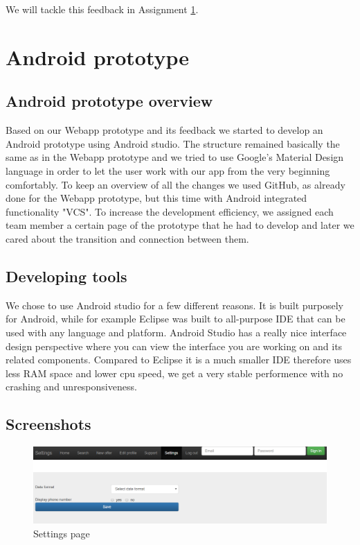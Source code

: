\documentclass[11pt,twoside,a4paper]{report}
\begin{document}
We will tackle this feedback in Assignment \ref{assignment:android-prototype}.

\chapter{Android prototype}
\label{assignment:android-prototype}

\section{Android prototype overview}
Based on our Webapp prototype and its feedback we started to develop an Android prototype using Android studio. The structure remained basically the same as in the Webapp prototype and we tried to use Google’s Material Design language in order to let the user work with our app from the very beginning comfortably. To keep an overview of all the changes we used GitHub, as already done for the Webapp prototype, but this time with Android integrated functionality "VCS".
To increase the development efficiency, we assigned each team member a certain page of the prototype that he had to develop and later we cared about the transition and connection between them.

\section{Developing tools}
We chose to use Android studio for a few different reasons. It is built purposely for Android, while for example Eclipse was built to all-purpose IDE that can be used with 
any language and platform. Android Studio has a really nice interface design perspective where you can view the interface you are working on and its related components.
Compared to Eclipse it is a much smaller IDE therefore uses less RAM space and lower cpu speed, we get a very stable performence with no crashing and unresponsiveness.

\section{Screenshots}
\begin{figure}
	\centering
	\includegraphics[width=\textwidth]{png/webapp-settings.png}
	\caption{Settings page}
	\label{figure:settings-page}
\end{figure}
\end{document}
